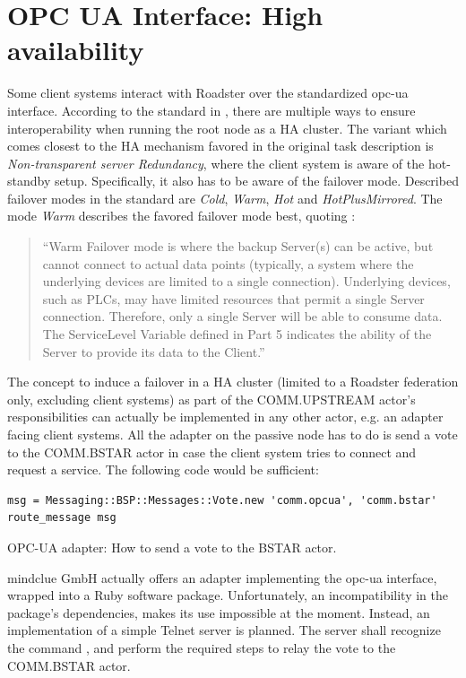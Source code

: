 \section{OPC UA Interface: High availability}\label{sec:approach:opc-ua}
Some client systems interact with Roadster over the standardized \gls{opc-ua}
interface. According to the standard in \cite[6.4.2 Server Redundancy,
p.~94]{opc-ua:behavior:server-redundancy}, there are multiple ways to ensure
interoperability when running the root node as a \gls{HA} cluster. The variant
which comes closest to the \gls{HA} mechanism favored in the original task description is
\emph{Non-transparent server Redundancy}, where the client system is aware of
the hot-standby setup. Specifically, it also has to be aware of the failover
mode. Described failover modes in the standard are \emph{Cold}, \emph{Warm},
\emph{Hot} and \emph{HotPlusMirrored}. The mode \emph{Warm} describes the
favored failover mode best, quoting \cite[6.4.2.4.4 Server Failover Modes,
p.~98]{opc-ua:behavior:server-redundancy}:


\begin{quote}
``Warm Failover mode is where the backup Server(s) can be active, but cannot
connect to actual data points (typically, a system where the underlying devices
are limited to a single connection). Underlying devices, such as PLCs, may have
limited resources that permit a single Server connection. Therefore, only a
single Server will be able to consume data. The ServiceLevel Variable defined
in Part 5 indicates the ability of the Server to provide its data to the
Client.''
\end{quote}

The concept to induce a failover in a \gls{HA} cluster (limited to a
Roadster federation only, excluding client systems) as part of the
COMM.UPSTREAM actor's responsibilities can actually be implemented in any other
actor, e.g. an adapter facing client systems. All the adapter on the passive
node has to do is send a vote to the COMM.BSTAR actor in case the client system
tries to connect and request a service. The following code would be sufficient:

\begin{listing}[H]
  \begin{verbatim}
msg = Messaging::BSP::Messages::Vote.new 'comm.opcua', 'comm.bstar'
route_message msg
  \end{verbatim}
  \caption{OPC-UA adapter: How to send a vote to the BSTAR actor.}
  \label{lst:approach:opc-ua}
\end{listing}

mindclue GmbH actually offers an adapter implementing the \gls{opc-ua}
interface, wrapped into a Ruby software package. Unfortunately, an
incompatibility in the package's dependencies, makes its use impossible at the
moment. Instead, an implementation of a simple Telnet server is planned. The
server shall recognize the command , and perform the required steps to
relay the vote to the COMM.BSTAR actor.
